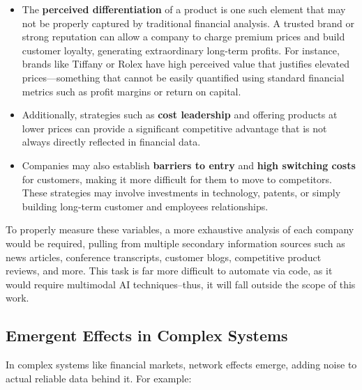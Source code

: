 \documentclass[11pt,english,a4paper,hidelinks]{book}
\begin{document}
\begin{itemize}
    \item The \textbf{perceived differentiation} of a product is one such element that may not be properly captured by traditional financial analysis. A trusted brand or strong reputation can allow a company to charge premium prices and build customer loyalty, generating extraordinary long-term profits. For instance, brands like Tiffany or Rolex have high perceived value that justifies elevated prices—something that cannot be easily quantified using standard financial metrics such as profit margins or return on capital.

    \item Additionally, strategies such as \textbf{cost leadership} and offering products at lower prices can provide a significant competitive advantage that is not always directly reflected in financial data.

    \item Companies may also establish \textbf{barriers to entry} and \textbf{high switching costs} for customers, making it more difficult for them to move to competitors. These strategies may involve investments in technology, patents, or simply building long-term customer and employees relationships.
\end{itemize}

\noindent To properly measure these variables, a more exhaustive analysis of each company would be required, pulling from multiple secondary information sources such as news articles, conference transcripts, customer blogs, competitive product reviews, and more. This task is far more difficult to automate via code, as it would require multimodal AI techniques--thus, it will fall outside the scope of this work.

\subsection{Emergent Effects in Complex Systems}

\noindent In complex systems like financial markets, network effects emerge, adding noise to actual reliable data behind it. For example:
\end{document}
